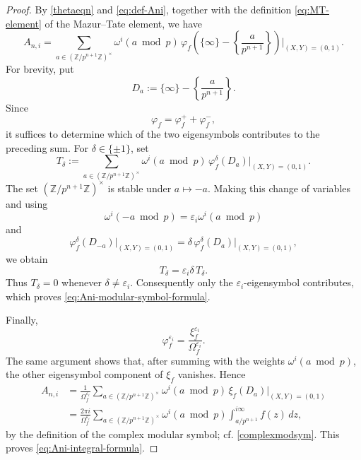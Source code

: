 \documentclass[11pt,table]{amsart}
\newcommand{\Z}{\mathbb{Z}}
\numberwithin{equation}{section}
\begin{document}
\begin{proof}
By \eqref{thetaeqn} and \eqref{eq:def-Ani}, together with the
definition \eqref{eq:MT-element} of the Mazur--Tate element, we have
\[
        A_{n,i}
        =
        \sum_{a\in(\Z/p^{n+1}\Z)^\times}
        \omega^i(a\bmod p)\,
        \varphi_f
        \left(
        \{\infty\}
        -
        \left\{\frac{a}{p^{n+1}}\right\}
        \right)\Big|_{(X,Y)=(0,1)}.
\]
For brevity, put
\[
        D_a
        :=
        \{\infty\}
        -
        \left\{\frac{a}{p^{n+1}}\right\}.
\]
Since
\[
        \varphi_f=\varphi_f^++\varphi_f^-,
\]
it suffices to determine which of the two eigensymbols contributes to
the preceding sum.  For \(\delta\in\{\pm1\}\), set
\[
        T_\delta
        :=
        \sum_{a\in(\Z/p^{n+1}\Z)^\times}
        \omega^i(a\bmod p)\,
        \varphi_f^\delta(D_a)\Big|_{(X,Y)=(0,1)}.
\]
The set \((\Z/p^{n+1}\Z)^\times\) is stable under \(a\mapsto-a\).
Making this change of variables and using
\[
        \omega^i(-a\bmod p)
        =
        \varepsilon_i\omega^i(a\bmod p)
\]
and
\[
        \varphi_f^\delta(D_{-a})\Big|_{(X,Y)=(0,1)}
        =
        \delta\,
        \varphi_f^\delta(D_a)\Big|_{(X,Y)=(0,1)},
\]
we obtain
\[
        T_\delta
        =
        \varepsilon_i\delta\,T_\delta.
\]
Thus \(T_\delta=0\) whenever
\(\delta\neq\varepsilon_i\).  Consequently only the
\(\varepsilon_i\)-eigensymbol contributes, which proves
\eqref{eq:Ani-modular-symbol-formula}.
\par Finally,
\[
        \varphi_f^{\varepsilon_i}
        =
        \frac{\xi_f^{\varepsilon_i}}
             {\Omega_f^{\varepsilon_i}}.
\]
The same argument shows that, after summing with the weights
\(\omega^i(a\bmod p)\), the other eigensymbol component of \(\xi_f\)
vanishes. Hence
\[
\begin{aligned}
        A_{n,i}
        &=
        \frac{1}{\Omega_f^{\varepsilon_i}}
        \sum_{a\in(\Z/p^{n+1}\Z)^\times}
        \omega^i(a\bmod p)\,
        \xi_f(D_a)\Big|_{(X,Y)=(0,1)} \\
        &=
        \frac{2\pi i}{\Omega_f^{\varepsilon_i}}
        \sum_{a\in(\Z/p^{n+1}\Z)^\times}
        \omega^i(a\bmod p)
        \int_{a/p^{n+1}}^{i\infty}f(z)\,dz,
\end{aligned}
\]
by the definition of the complex modular symbol; cf. \eqref{complexmodsym}. This proves
\eqref{eq:Ani-integral-formula}.
\end{proof}
\end{document}
